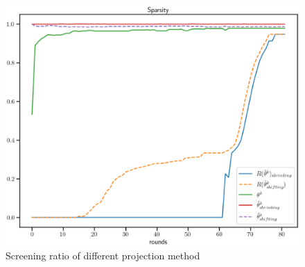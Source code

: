 \documentclass[twoside]{article}
\theoremstyle{plain}
\begin{document}
\begin{figure}[htbp]
\begin{center}
\includegraphics[width = \linewidth]{pic/sparse_proj}
\caption{Screening ratio of different projection method}
\end{center}
\end{figure}
\end{document}
